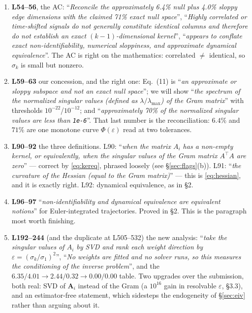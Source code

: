 \documentclass[11pt]{article}
\newcommand{\Mat}[1]{\mathbf{#1}}
\newcommand{\A}{\Mat{A}}
\newcommand{\eps}{\varepsilon}
\begin{document}
\begin{enumerate}
\item \textbf{L54--56}, the AC: ``\emph{Reconcile the approximately 6.4\% null
plus 4.0\% sloppy edge dimensions with the claimed 71\% exact null space}'',
``\emph{Highly correlated or time-shifted signals do not generally constitute
identical columns and therefore do not establish an exact $(k-1)$-dimensional
kernel}'', ``\emph{appears to conflate exact non-identifiability, numerical
sloppiness, and approximate dynamical equivalence}''. The AC is right on the
mathematics: correlated $\neq$ identical, so $\sigma_k$ is small but nonzero.

\item \textbf{L59--63} our concession, and the right one: Eq.~(11) is
``\emph{an approximate or sloppy subspace and not an exact null space}''; we will
show ``\emph{the spectrum of the normalized singular values (defined as
$\lambda/\lambda_{\max}$) of the Gram matrix}'' with thresholds
$10^{-22}$/$10^{-12}$; and ``\emph{approximately 70\% of the normalized singular
values are less than \texttt{1e-6}}''. That last number is the reconciliation:
$6.4\%$ and $71\%$ are one monotone curve $\Phi(\eps)$ read at two tolerances.

\item \textbf{L90--92} the three definitions. L90: ``\emph{when the matrix $A_i$
has a non-empty kernel, or equivalently, when the singular values of the Gram
matrix $A^\top A$ are zero}'' --- correct by \eqref{eq:kereq}, phrased loosely
(see §\ref{sec:flags}(b)). L91: ``\emph{the curvature of the Hessian (equal to
the Gram matrix)}'' --- this is \eqref{eq:hessian}, and it is exactly right.
L92: dynamical equivalence, as in §2.

\item \textbf{L96--97} ``\emph{non-identifiability and dynamical equivalence are
equivalent notions}'' for Euler-integrated trajectories. Proved in §2. This is
the paragraph most worth finishing.

\item \textbf{L192--244} (and the duplicate at L505--532) the new analysis:
``\emph{take the singular values of $A_i$ by SVD and rank each weight direction
by $\eps = (\sigma_k/\sigma_1)^2$}'', ``\emph{No weights are fitted and no solver
runs, so this measures the conditioning of the inverse problem}'', and the
$6.35/4.01 \to 2.44/0.32 \to 0.00/0.00$ table. Two upgrades over the submission,
both real: SVD of $\A_i$ instead of the Gram (a $10^{16}$ gain in resolvable
$\eps$, §3.3), and an estimator-free statement, which sidesteps the endogeneity
of §\ref{sec:eiv} rather than arguing about it.


\end{enumerate}
\end{document}
